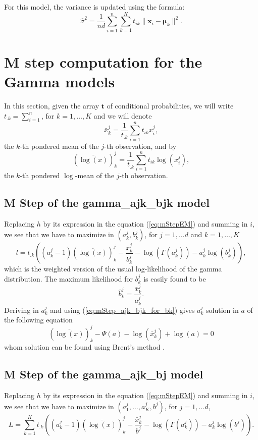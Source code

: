 \documentclass[a4paper,10pt]{article}
\newcommand{\bx}{\mathbf{x}}
\newcommand{\bt}{\mathbf{t}}
\newcommand{\bmu}{\boldsymbol{\mu}}
\begin{document}
For this model, the variance is updated using the formula:
$$
\hat{\sigma}^2 = \frac{1}{nd} \sum_{i=1}^n \sum_{k=1}^K t_{ik} \|\bx_i-\bmu_k\|^2.
$$

\section{M step computation for the Gamma models}
In this section, given the array $\bt$ of conditional probabilities, we will write
$t_{.k} = \sum_{i=1}^n$, for $k=1,\ldots,K$ and we will denote
$$
\bar{x}^j_k = \frac{1}{t_{.k}} \sum_{i=1}^n t_{ik} x^j_i,
$$
the $k$-th pondered mean of the $j$-th observation, and by
$$
(\overline{\log(x)})^j_k = \frac{1}{t_{.k}} \sum_{i=1}^n t_{ik} \log(x^j_i),
$$
the $k$-th pondered $\log$-mean of the $j$-th observation.

\subsection{M Step of the gamma\_ajk\_bjk model}
Replacing $h$ by its expression in the equation (\ref{eq:mStepEM}) and summing in $i$, we see that we have to maximize in
$(a^j_k,b^j_k)$, for $j=1,\ldots d$ and $k=1,\ldots, K$
\begin{equation}\label{eq:mStep_ajk_bjk}
l = t_{.k} \left( (a^j_k-1)(\overline{\log(x)})^j_k - \frac{\bar{x}^j_k}{b^j_k} - \log(\Gamma(a^j_k)) - a^j_k \log(b^j_k) \right),
\end{equation}
which is the weighted version of the usual log-likelihood of the gamma distribution. The maximum likelihood for $b^j_k$ is
easily found to be
\begin{equation}\label{eq:mStep_ajk_bjk_for_bk}
\hat{b}^j_k = \frac{\bar{x}^j_k}{a^j_k}.
\end{equation}
Deriving in $a^j_k$ and using (\ref{eq:mStep_ajk_bjk_for_bk}) gives $a^j_k$ solution in $a$ of the
following equation
\begin{equation}\label{eq:mStep_ajk_bjk_zero}
  (\overline{\log(x)})^j_k - \Psi(a) - \log(\bar{x}^j_k) + \log(a) =0
\end{equation}
whom solution can be found using Brent's method \cite{Brent1973}.

\subsection{M Step of the gamma\_ajk\_bj model}
Replacing $h$ by its expression in the equation (\ref{eq:mStepEM}) and summing in $i$, we see that we have to maximize in
$(a^j_1,\ldots, a^j_K, b^j)$, for $j=1,\ldots d$,
\begin{equation}\label{eq:mStep_ajk_bj}
L =\sum_{k=1}^{K} t_{.k} \left( (a^j_k-1)(\overline{\log(x)})^j_k - \frac{\bar{x}^j_k}{b^j} - \log(\Gamma(a^j_k)) - a^j_k \log(b^j) \right).
\end{equation}
\end{document}
